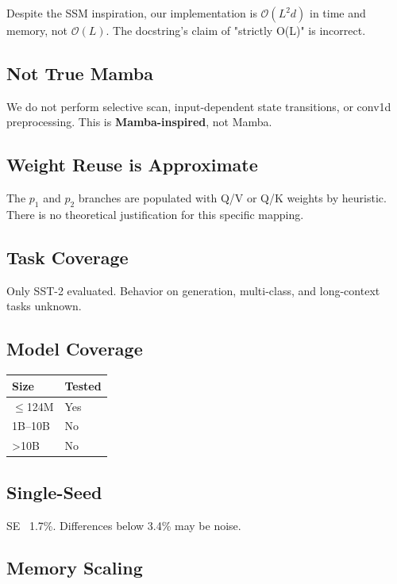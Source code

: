 Despite the SSM inspiration, our implementation is \textbf{$\mathcal{O}(L^2 d)$} in 
time and memory, not $\mathcal{O}(L)$. The docstring's claim of "strictly 
O(L)" is incorrect.

\subsection{Not True Mamba}

We do not perform selective scan, input-dependent state transitions, or 
conv1d preprocessing. This is \textbf{Mamba-inspired}, not Mamba.

\subsection{Weight Reuse is Approximate}

The $p_1$ and $p_2$ branches are populated with Q/V or Q/K weights by 
heuristic. There is no theoretical justification for this specific mapping.

\subsection{Task Coverage}

Only SST-2 evaluated. Behavior on generation, multi-class, and long-context 
tasks unknown.

\subsection{Model Coverage}

\begin{table}[H]
\centering
\small
\begin{tabular}{ll}
\toprule
\textbf{Size} & \textbf{Tested} \\
\midrule
$\le$124M & Yes \\
1B--10B & No \\
\textgreater{}10B & No \\
\bottomrule
\end{tabular}
\end{table}

\subsection{Single-Seed}

SE ~1.7\%. Differences below 3.4\% may be noise.

\subsection{Memory Scaling}

